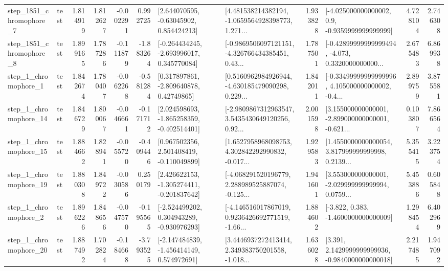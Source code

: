 \begin{tabular}{llrrrrllrlrr}
  step\_1851\_chromophore\_7 &      test &      1.814919 &    1.812627 &     -0.002291 &  0.992725 &     [2.644070595, -0.63045902, 0.854424213] &  [4.481538214382194, -1.0659564928398773, 1.271... &       1.933828 &     [-4.025000000000002, 0.9, -0.9359999999999999] &            4.728104 &          2.746308 \\
  step\_1851\_chromophore\_8 &      test &      1.899165 &    1.787286 &     -0.111879 & -1.883264 &   [-0.264434245, -2.693996017, 0.345770084] &  [-0.9869506097121151, -4.326766434385451, 0.43... &       1.787501 &  [-0.42899999999999494, -4.073, 0.3320000000000... &            2.675483 &          6.869938 \\
     step\_1\_chromophore\_1 &      test &      1.842674 &    1.780407 &     -0.062268 & -0.581284 &     [0.317897861, -2.809640878, 0.42749865] &  [0.5160962984926944, -4.630185479090298, 0.229... &       1.842011 &  [-0.33499999999999996, 4.105000000000002, -0.4... &            2.899759 &          3.875581 \\
    step\_1\_chromophore\_14 &      test &      1.846729 &    1.800067 &     -0.046661 & -0.171712 &   [2.024598693, -1.865258359, -0.402514401] &  [-2.9809867312963547, 3.5435430649120256, 0.92... &       2.001598 &  [3.155000000000001, -2.899000000000001, -0.621... &            0.103807 &          7.866564 \\
    step\_1\_chromophore\_15 &      test &      1.884662 &    1.828941 &     -0.055720 & -0.409446 &    [0.967502356, 2.501408419, -0.110049899] &  [1.6527958968098753, 4.302842292990832, -0.017... &       1.929583 &  [1.4550000000000054, 3.817999999999998, 0.2139... &            5.355415 &          3.223754 \\
    step\_1\_chromophore\_19 &      test &      1.880308 &    1.849722 &     -0.030586 &  0.250179 &   [2.426622153, -1.305274411, -0.201837642] &  [-4.068291520196779, 2.288989525887074, -0.125... &       1.941601 &  [3.553000000000001, -2.029999999999994, 0.0759... &            5.453886 &          0.605848 \\
     step\_1\_chromophore\_2 &      test &      1.896226 &    1.848656 &     -0.047570 & -0.195565 &   [-2.524499202, 0.304943289, -0.930976293] &  [-4.146516017867019, 0.9236426692771519, -1.66... &       1.884602 &               [-3.822, 0.383, -1.4600000000000009] &            1.298454 &          6.402969 \\
    step\_1\_chromophore\_20 &      test &      1.887492 &    1.702824 &     -0.184668 & -3.793525 &   [-2.147484839, -1.456414149, 0.574972691] &  [3.4446937272413414, 2.349383750201558, -1.018... &       1.636028 &   [3.391, 2.1429999999999936, -0.9840000000000018] &            2.217485 &          1.947092 \\

\end{tabular}
